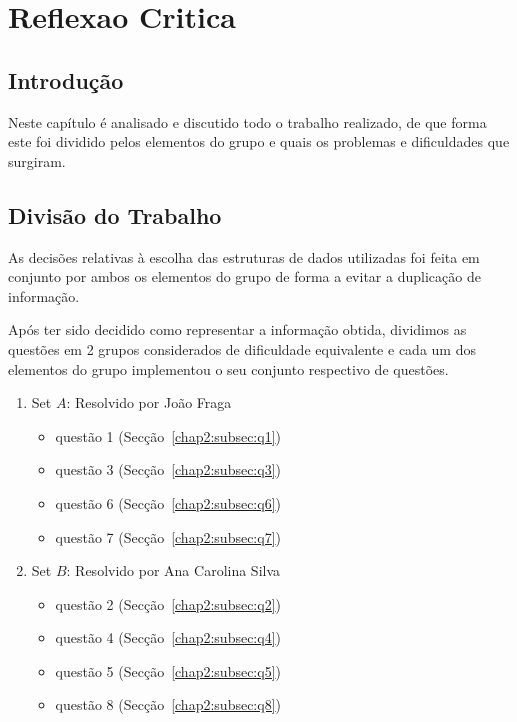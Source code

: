 \section{Reflexao Critica}
\label{chap:imp-test}

\subsection{Introdução}
\label{chap4:sec:intro}

Neste capítulo é analisado e discutido todo o trabalho realizado, de que forma este foi dividido pelos elementos do grupo e quais os problemas e dificuldades que surgiram.

\subsection{Divisão do Trabalho}
\label{chap4:sec:divisao}

As decisões relativas à escolha das estruturas de dados utilizadas foi feita em conjunto por ambos os elementos do grupo de forma a evitar a duplicação de informação.

Após ter sido decidido como representar a informação obtida, dividimos as questões em 2 grupos considerados de dificuldade equivalente e cada um dos elementos do grupo implementou o seu conjunto respectivo de questões.

\begin{enumerate}
  \item Set $A$: Resolvido por João Fraga
  \begin{itemize}
    \item questão 1 (Secção~\ref{chap2:subsec:q1})
    \item questão 3 (Secção~\ref{chap2:subsec:q3})
    \item questão 6 (Secção~\ref{chap2:subsec:q6})
    \item questão 7 (Secção~\ref{chap2:subsec:q7})
  \end{itemize}

  \item Set $B$: Resolvido por Ana Carolina Silva
  \begin{itemize}
      \item questão 2 (Secção~\ref{chap2:subsec:q2})
      \item questão 4 (Secção~\ref{chap2:subsec:q4})
      \item questão 5 (Secção~\ref{chap2:subsec:q5})
      \item questão 8 (Secção~\ref{chap2:subsec:q8})
  \end{itemize}
\end{enumerate}


